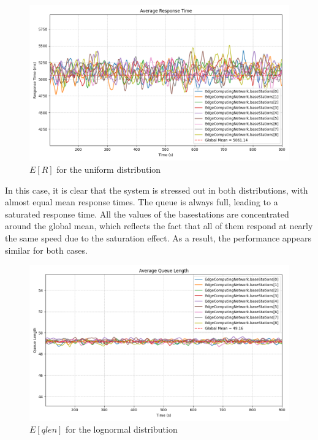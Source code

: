 \documentclass{report}
\begin{document}
\begin{figure}[H]
    \centering
    \includegraphics[width=\textwidth]{img/plots/uni_1e4_B/resptime.png}
    \caption{$E[R]$ for the uniform distribution}
\end{figure}

In this case, it is clear that the system is stressed out in both distributions, with almost equal mean response times. The queue is always full, leading to a saturated response time.
All the values of the basestations are concentrated around the global mean, which reflects the fact that all of them respond at nearly the same speed due to the saturation effect.
As a result, the performance appears similar for both cases.

\begin{figure}[H]
    \centering
    \includegraphics[width=\textwidth]{img/plots/log_1e4_B/qlen.png}
    \caption{$E[qlen]$ for the lognormal distribution}
\end{figure}
\end{document}
